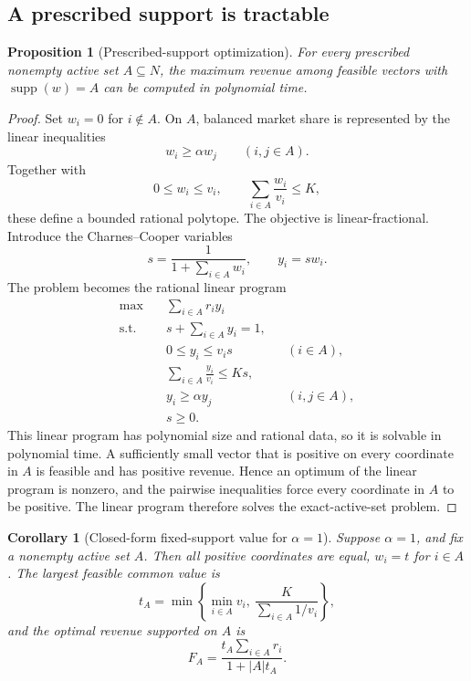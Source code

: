 \documentclass[11pt]{article}
\newtheorem{proposition}[theorem]{Proposition}
\newtheorem{corollary}[theorem]{Corollary}
\newcommand{\supp}{\operatorname{supp}}
\begin{document}
\subsection{A prescribed support is tractable}\label{sec:fixedsupport}

\begin{proposition}[Prescribed-support optimization]\label{prop:fixedsupport}
For every prescribed nonempty active set $A\subseteq N$, the maximum revenue among feasible vectors with $\supp(w)=A$ can be computed in polynomial time.
\end{proposition}

\begin{proof}
Set $w_i=0$ for $i\notin A$. On $A$, balanced market share is represented by the linear inequalities
\[
 w_i\ge \alpha w_j\qquad(i,j\in A).
\]
Together with
\[
 0\le w_i\le v_i,\qquad \sum_{i\in A}\frac{w_i}{v_i}\le K,
\]
these define a bounded rational polytope. The objective is linear-fractional. Introduce the Charnes--Cooper variables
\[
 s=\frac1{1+\sum_{i\in A}w_i},\qquad y_i=sw_i.
\]
The problem becomes the rational linear program
\begin{align*}
 \max\quad &\sum_{i\in A}r_iy_i\\
 \text{s.t.}\quad &s+\sum_{i\in A}y_i=1,\\
 &0\le y_i\le v_is &&(i\in A),\\
 &\sum_{i\in A}\frac{y_i}{v_i}\le Ks,\\
 &y_i\ge \alpha y_j &&(i,j\in A),\\
 &s\ge0.
\end{align*}
This linear program has polynomial size and rational data, so it is solvable in polynomial time. A sufficiently small vector that is positive on every coordinate in $A$ is feasible and has positive revenue. Hence an optimum of the linear program is nonzero, and the pairwise inequalities force every coordinate in $A$ to be positive. The linear program therefore solves the exact-active-set problem.
\end{proof}

\begin{corollary}[Closed-form fixed-support value for $\alpha=1$]\label{cor:alpha1fixed}
Suppose $\alpha=1$, and fix a nonempty active set $A$. Then all positive coordinates are equal, $w_i=t$ for $i\in A$. The largest feasible common value is
\[
 t_A=\min\left\{\min_{i\in A}v_i,\ \frac{K}{\sum_{i\in A}1/v_i}\right\},
\]
and the optimal revenue supported on $A$ is
\[
 F_A=\frac{t_A\sum_{i\in A}r_i}{1+|A|t_A}.
\]
\end{corollary}
\end{document}
